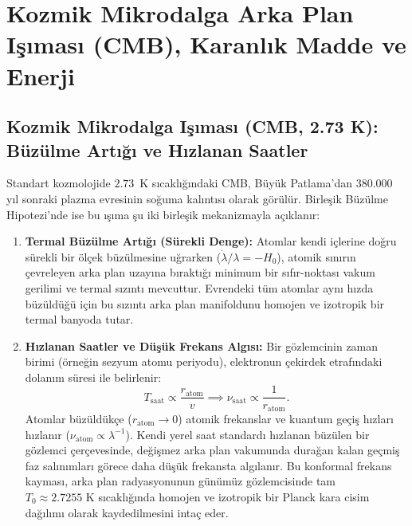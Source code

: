 \section{Kozmik Mikrodalga Arka Plan Işıması (CMB), Karanlık Madde ve Enerji}
\label{sec:cmb_karanlik_madde}

\subsection{Kozmik Mikrodalga Işıması (CMB, 2.73 K): Büzülme Artığı ve Hızlanan Saatler}
Standart kozmolojide $2.73$~K sıcaklığındaki CMB, Büyük Patlama'dan 380.000 yıl sonraki plazma evresinin soğuma kalıntısı olarak görülür. Birleşik Büzülme Hipotezi'nde ise bu ışıma şu iki birleşik mekanizmayla açıklanır:

\begin{enumerate}
    \item \textbf{Termal Büzülme Artığı (Sürekli Denge):}
          Atomlar kendi içlerine doğru sürekli bir ölçek büzülmesine uğrarken ($\dot{\lambda}/\lambda = -H_0$), atomik sınırın çevreleyen arka plan uzayına bıraktığı minimum bir sıfır-noktası vakum gerilimi ve termal sızıntı mevcuttur. Evrendeki tüm atomlar aynı hızda büzüldüğü için bu sızıntı arka plan manifoldunu homojen ve izotropik bir termal banyoda tutar.

    \item \textbf{Hızlanan Saatler ve Düşük Frekans Algısı:}
          Bir gözlemcinin zaman birimi (örneğin sezyum atomu periyodu), elektronun çekirdek etrafındaki dolanım süresi ile belirlenir:
          \begin{equation}
              T_{\mathrm{saat}} \propto \frac{r_{\mathrm{atom}}}{v} \implies \nu_{\mathrm{saat}} \propto \frac{1}{r_{\mathrm{atom}}}.
              \label{eq:hizlanan_saat}
          \end{equation}
          Atomlar büzüldükçe ($r_{\mathrm{atom}} \to 0$) atomik frekanslar ve kuantum geçiş hızları hızlanır ($\nu_{\mathrm{atom}} \propto \lambda^{-1}$). Kendi yerel saat standardı hızlanan büzülen bir gözlemci çerçevesinde, değişmez arka plan vakumunda durağan kalan geçmiş faz salınımları görece daha düşük frekansta algılanır. Bu konformal frekans kayması, arka plan radyasyonunun günümüz gözlemcisinde tam $T_0 \approx 2.7255\text{ K}$ sıcaklığında homojen ve izotropik bir Planck kara cisim dağılımı olarak kaydedilmesini intaç eder.


\end{enumerate}
